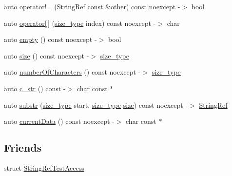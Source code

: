 \begin{DoxyCompactItemize}
\item 
auto \mbox{\hyperlink{class_catch_1_1_string_ref_aaa6c8bf61c4628034c19763d1c8ad215}{operator!=}} (\mbox{\hyperlink{class_catch_1_1_string_ref}{String\+Ref}} const \&other) const noexcept -\/$>$ bool
\item 
auto \mbox{\hyperlink{class_catch_1_1_string_ref_a4ba2e01eec1f0f56c257d213c796ab3b}{operator\mbox{[}$\,$\mbox{]}}} (\mbox{\hyperlink{class_catch_1_1_string_ref_a06b4db8fc82b197004291cf370b2ba7c}{size\+\_\+type}} index) const noexcept -\/$>$ char
\item 
auto \mbox{\hyperlink{class_catch_1_1_string_ref_ac6b68b9dc1e1dec69e884e3f7be581bd}{empty}} () const noexcept -\/$>$ bool
\item 
auto \mbox{\hyperlink{class_catch_1_1_string_ref_ae084d72cb2952cee61a63ef36611d0ad}{size}} () const noexcept -\/$>$ \mbox{\hyperlink{class_catch_1_1_string_ref_a06b4db8fc82b197004291cf370b2ba7c}{size\+\_\+type}}
\item 
auto \mbox{\hyperlink{class_catch_1_1_string_ref_a6a6cac7430e626ffdd7550a081e8168f}{number\+Of\+Characters}} () const noexcept -\/$>$ \mbox{\hyperlink{class_catch_1_1_string_ref_a06b4db8fc82b197004291cf370b2ba7c}{size\+\_\+type}}
\item 
auto \mbox{\hyperlink{class_catch_1_1_string_ref_a1669cb2765e820ca258159676cbd82a5}{c\+\_\+str}} () const -\/$>$ char const $\ast$
\item 
auto \mbox{\hyperlink{class_catch_1_1_string_ref_a248568b467cf6599320903ae613c8eee}{substr}} (\mbox{\hyperlink{class_catch_1_1_string_ref_a06b4db8fc82b197004291cf370b2ba7c}{size\+\_\+type}} start, \mbox{\hyperlink{class_catch_1_1_string_ref_a06b4db8fc82b197004291cf370b2ba7c}{size\+\_\+type}} \mbox{\hyperlink{class_catch_1_1_string_ref_ae084d72cb2952cee61a63ef36611d0ad}{size}}) const noexcept -\/$>$ \mbox{\hyperlink{class_catch_1_1_string_ref}{String\+Ref}}
\item 
auto \mbox{\hyperlink{class_catch_1_1_string_ref_aee240387305ca8b249169d79f36e7002}{current\+Data}} () const noexcept -\/$>$ char const $\ast$
\end{DoxyCompactItemize}
\subsection*{Friends}
\begin{DoxyCompactItemize}
\item 
struct \mbox{\hyperlink{class_catch_1_1_string_ref_a420e64e1652de1b0d427775781b018f5}{String\+Ref\+Test\+Access}}
\end{DoxyCompactItemize}


